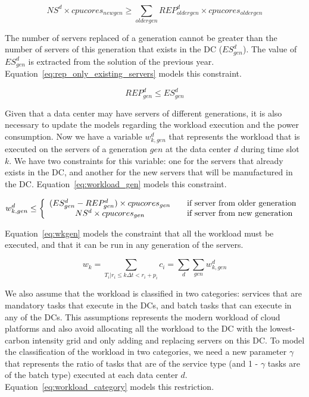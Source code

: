 \begin{equation} \label{eq:dc_cpu_capacity}
 NS^d \times cpucores_{newgen} \geq \sum_{oldergen}  REP_{oldergen}^d \times cpucores_{oldergen}
\end{equation}

The number of servers replaced of a generation cannot be greater than the number of servers of this generation that exists in the DC ($ES_{gen}^d $). The value of  $ES_{gen}^d $ is extracted from the solution of the previous year. Equation~\eqref{eq:rep_only_existing_servers} models this constraint.

\begin{equation} \label{eq:rep_only_existing_servers}
 REP_{gen}^d \leq ES_{gen}^d 
\end{equation}


Given that a data center may have servers of different generations, it is also necessary to update the models regarding the workload execution and the power consumption. Now we have a variable $w_{k,gen}^d$ that represents the workload that is executed on the servers of a generation $gen$ at the data center $d$ during time slot $k$. We have two constraints for this variable: one for the servers that already exists in the DC, and another for the new servers that will be manufactured in the DC. Equation~\eqref{eq:workload_gen} models this constraint.


\begin{equation} \label{eq:workload_gen}
w_{k,gen}^d \leq   \left\{ 
  \begin{array}{ c l }
    (ES_{gen}^d - REP_{gen}^d) \times cpucores_{gen}  & \quad \textrm{if server from older generation  }     \\
     NS^d \times cpucores_{gen}   & \quad \textrm{if server from new generation  }      \\
    
  \end{array}
\right.
\end{equation}

Equation~\eqref{eq:wkgen} models the constraint that all the workload must be executed, and that it can be run in any generation of the servers.

\begin{equation} \label{eq:wkgen}
    w_k = \sum_{T_i|r_i\leq k\Delta t<r_i+p_i} c_i = \sum_d \sum_{gen} w_{k,gen}^d
\end{equation}

We also assume that the workload is classified in two categories: services that are mandatory tasks that execute in the DCs, and batch tasks that can execute in any of the DCs. This assumptions represents the modern workload of cloud platforms and also avoid allocating all the workload to the DC with the lowest-carbon intensity grid and only adding and replacing servers on this DC. To model the classification of the workload in two categories, we need a new parameter $\gamma$ that represents the ratio of tasks that are of the service type (and 1 - $\gamma$ tasks are of the batch type) executed at each data center $d$. Equation~\eqref{eq:workload_category} models this restriction.

